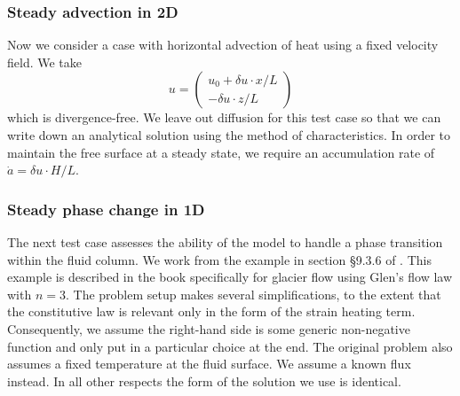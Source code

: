 \documentclass{article}
\theoremstyle{definition}
\theoremstyle{plain}
\begin{document}
\subsubsection{Steady advection in 2D}
Now we consider a case with horizontal advection of heat using a fixed velocity field.
We take
\begin{equation}
    u = \left(\begin{matrix}u_0 + \delta u\cdot x / L \\ -\delta u \cdot z / L\end{matrix}\right)
\end{equation}
which is divergence-free.
We leave out diffusion for this test case so that we can write down an analytical solution using the method of characteristics.
In order to maintain the free surface at a steady state, we require an accumulation rate of $\dot a = \delta u \cdot H / L$.

\subsubsection{Steady phase change in 1D}
The next test case assesses the ability of the model to handle a phase transition within the fluid column.
We work from the example in section \S9.3.6 of \citet{greve2009dynamics}.
This example is described in the book specifically for glacier flow using Glen's flow law with $n = 3$.
The problem setup makes several simplifications, to the extent that the constitutive law is relevant only in the form of the strain heating term.
Consequently, we assume the right-hand side is some generic non-negative function and only put in a particular choice at the end.
The original problem also assumes a fixed temperature at the fluid surface.
We assume a known flux instead.
In all other respects the form of the solution we use is identical.
\end{document}
